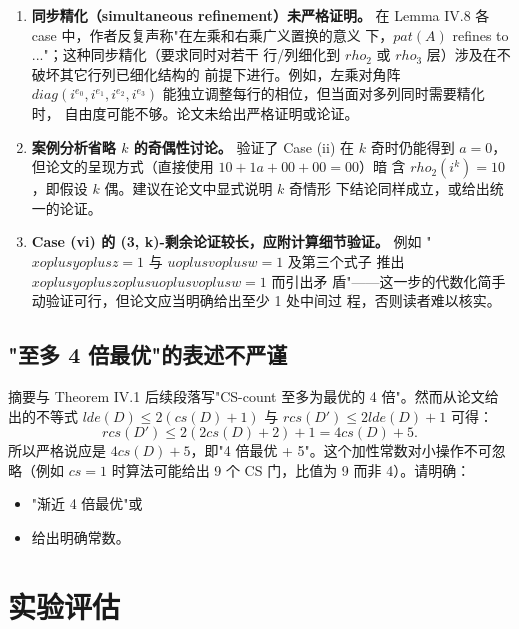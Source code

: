 \documentclass[10pt,a4paper]{article}
\def\rho{rho}%
\def\oplus{oplus}%
\def\mathrm#1{#1}%
\begin{document}
\begin{enumerate}[label=(\alph*)]
\item \textbf{同步精化（simultaneous refinement）未严格证明。} 在 Lemma
  IV.8 各 case 中，作者反复声称"在左乘和右乘广义置换的意义
  下，$\mathrm{pat}(A)$ refines to ..."；这种同步精化（要求同时对若干
  行/列细化到 $\rho_2$ 或 $\rho_3$ 层）涉及在不破坏其它行列已细化结构的
  前提下进行。例如，左乘对角阵 $\mathrm{diag}(i^{e_0}, i^{e_1},
  i^{e_2}, i^{e_3})$ 能独立调整每行的相位，但当面对多列同时需要精化时，
  自由度可能不够。论文未给出严格证明或论证。
 
\item \textbf{案例分析省略 $k$ 的奇偶性讨论。} 验证了 Case (ii) 在 $k$ 奇时仍能得到
  $a = 0$，但论文的呈现方式（直接使用 $10 + 1a + 00 + 00 = 00$）暗
  含 $\rho_2(i^k) = 10$，即假设 $k$ 偶。建议在论文中显式说明 $k$ 奇情形
  下结论同样成立，或给出统一的论证。
 
\item \textbf{Case (vi) 的 (3, k)-剩余论证较长，应附计算细节验证。} 例如
  "$x \oplus y \oplus z = 1$ 与 $u \oplus v \oplus w = 1$ 及第三个式子
  推出 $x \oplus y \oplus z \oplus u \oplus v \oplus w = 1$ 而引出矛
  盾"——这一步的代数化简手动验证可行，但论文应当明确给出至少 1 处中间过
  程，否则读者难以核实。
\end{enumerate}
 
\subsection{"至多 4 倍最优"的表述不严谨}
 
摘要与 Theorem IV.1 后续段落写"CS-count 至多为最优的 4 倍"。然而从论文给出的不等式 $\mathrm{lde}(D) \leq 2(\mathrm{cs}(D) + 1)$ 与 $\mathrm{rcs}(D') \leq 2\mathrm{lde}(D) + 1$ 可得：
\[
\mathrm{rcs}(D') \leq 2(2\mathrm{cs}(D) + 2) + 1 = 4\mathrm{cs}(D) + 5.
\]
所以严格说应是 $4 \mathrm{cs}(D) + 5$，即"4 倍最优 + 5"。这个加性常数对小操作不可忽略（例如 $\mathrm{cs} = 1$ 时算法可能给出 9 个 CS 门，比值为 9 而非 4）。请明确：
\begin{itemize}
\item "渐近 4 倍最优"或
\item 给出明确常数。
\end{itemize}
 
\section{实验评估}
 
\end{document}
